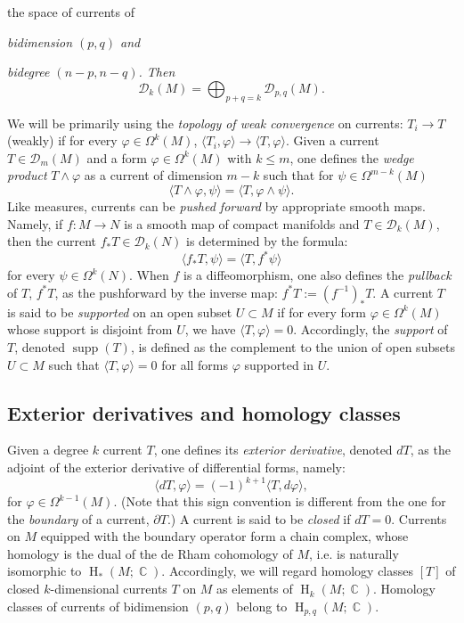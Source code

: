 \documentclass[12pt]{amsbook}%
\theoremstyle{definition}
\theoremstyle{remark}
\numberwithin{section}{chapter}
\numberwithin{subsection}{section}
\numberwithin{figure}{chapter}
\DeclareMathOperator{\C}{\mathbb{C}}
\DeclareMathOperator{\coh}{H}
\DeclareMathOperator{\supp}{supp}
\def\cD{{\mathscr{D}}}
\def\Om{\Omega}
\begin{document}
the space of currents of {\em bidimension $(p,q)$ and {\em bidegree $(n-p,n-q)$. 
\index{${\cD}^{p,q}$, the space of currents of bidegree $(p,q)$} 
Then
$$
{\cD}_k(M)= \bigoplus_{p+q=k} {\cD}_{p,q}(M). 
$$

We will be primarily using the {\em topology of weak convergence} on currents: 
$T_i\to T$ (weakly) if for every $\varphi\in \Omega^k(M)$, $\langle T_i, \varphi\rangle \to \langle T, \varphi \rangle$. 
Given a current $T\in {\cD}_m(M)$ and a form $\varphi\in \Omega^k(M)$ with $k\leqslant m$, one defines 
the {\em wedge product} $T\wedge \varphi$ as a current of dimension  $m-k$ such that for $\psi\in \Omega^{m-k}(M)$ 
$$
\langle T\wedge \varphi, \psi\rangle = \langle T , \varphi\wedge \psi \rangle. 
$$
Like measures, currents can be {\em pushed forward} by appropriate smooth maps. Namely, if $f \colon M \to N$ is a smooth map of compact manifolds 
and $T\in \cD_k(M)$, then  the current $f_* T\in \cD_k(N)$ is determined by the formula: 
\[ \langle f_* T , \psi\rangle = \langle T , f^* \psi \rangle\]
for every $\psi\in \Om^k(N)$.  When $f$ is a diffeomorphism, one also defines the {\em pullback} of $T$, $f^* T$, as the 
pushforward by the inverse map: $f^* T:=(f^{-1})_* T$.  A current $T$ is said to be {\em supported} 
on an open subset $U\subset M$ if for every form $\varphi\in \Om^k(M)$ whose support is disjoint from $U$, we have $\langle T, \varphi\rangle =0$. Accordingly, the {\em support} of $T$, denoted $\supp(T)$, is defined as the complement to the union of open subsets $U\subset M$ such that $\langle T, \varphi\rangle=0$ for all forms $\varphi$ supported 
in $U$.  


\subsection{Exterior derivatives and homology classes} 

Given a degree $k$ 
current $T$, one defines its  {\em exterior derivative}, denoted $dT$, 
as the adjoint of the exterior derivative of differential forms, namely: 
{ %
\begin{equation}
\langle dT, \varphi \rangle = {(-1)^{k+1}}\langle T , d\varphi \rangle,
\end{equation}
}
for $\varphi\in \Om^{k-1}(M)$. (Note that this sign convention is different from the one for the {\em boundary} of a current, $\partial T$.) A current is said to be {\em closed} if $dT=0$. Currents on $M$ equipped with the boundary operator form a chain complex, 
whose homology is the dual of the de Rham cohomology of $M$, i.e. is naturally isomorphic to $\coh_*(M; \C)$. 
Accordingly, we will regard homology classes $[T]$ of closed $k$-dimensional currents $T$ on $M$ as elements of $\coh_k(M; \C)$. Homology classes of currents of bidimension $(p,q)$ belong to $\coh_{p,q}(M; \C)$. 

}}
\end{document}
